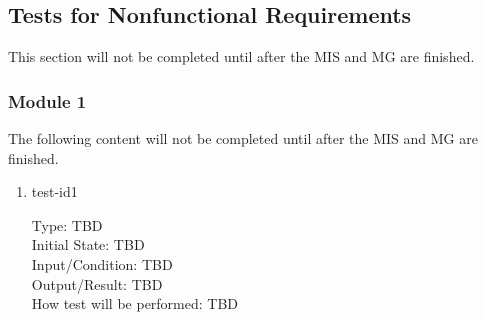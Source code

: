 \documentclass[12pt, titlepage]{article}
\begin{document}
\subsection{Tests for Nonfunctional Requirements}
This section will not be completed until after the MIS and MG are finished.

\subsubsection{Module 1}
The following content will not be completed until after the MIS and MG are finished.		
\begin{enumerate}

\item{test-id1\\}

Type: TBD \\				
Initial State: TBD	\\			
Input/Condition: TBD \\				
Output/Result: TBD	\\			
How test will be performed: TBD \\

\end{enumerate}
				
\end{document}
